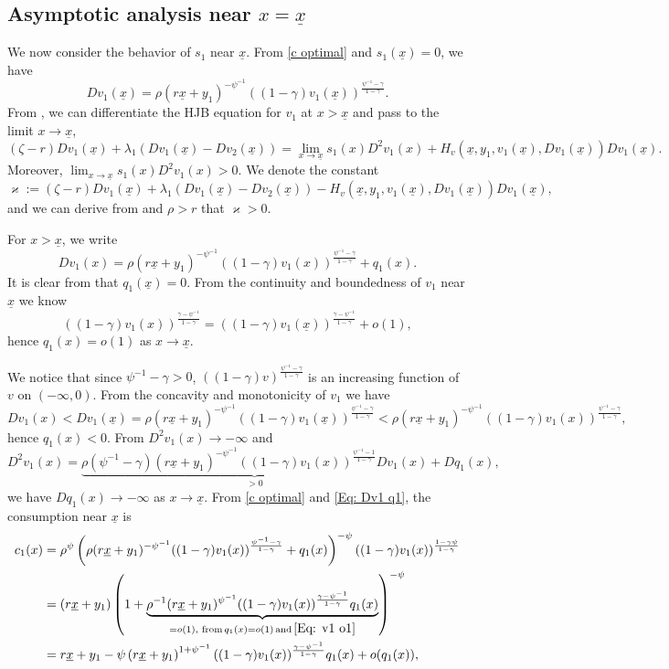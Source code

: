 \documentclass[11pt]{article}
\numberwithin{equation}{section}
\theoremstyle{definition}
\newcommand{\ux}{{\underline x}}
\newcommand{\beq}{\begin{equation}}
\newcommand{\eeq}{\end{equation}}
\newcommand{\ld}{\lambda}
\newcommand{\g}{\gamma}
\newcommand{\p}{\psi}
\newcommand{\z}{\zeta}
\newcommand{\lc}{\left(}
\newcommand{\rc}{\right)}
\theoremstyle{plain}
\begin{document}
\begin{appendices}
\section{Asymptotic analysis near $x=\ux$}\label{Expansion ux}
We now consider the behavior of $s_1$ near $\ux$. From \cref{c optimal} and $s_1(\ux)=0$, we have 
\beq\label{Eq: Dv1 ux}
Dv_1(\ux)=\rho (r\ux+y_1)^{-\p^{-1}}((1-\g)v_1(\ux))^{\frac{\p^{-1}-\g}{1-\g}}.
\eeq
From , we can differentiate the HJB equation for $v_1$ at $x>\ux$ and pass to the limit $x\to \ux$, 
$$
(\z-r)Dv_1(\ux)+\ld_1(Dv_1(\ux)-Dv_2(\ux))=\lim_{x\to \ux}s_1(x)D^2v_1(x)+H_v(\ux,y_1,v_1(\ux),Dv_1(\ux))Dv_1(\ux).
$$
Moreover, $\lim_{x\to \ux}s_1(x)D^2v_1(x)>0$. We denote the constant 
$$
\varkappa:=(\z-r)Dv_1(\ux)+\ld_1(Dv_1(\ux)-Dv_2(\ux))-H_v(\ux,y_1,v_1(\ux),Dv_1(\ux))Dv_1(\ux),
$$
and we can derive from  and $\rho> r$ that $\varkappa>0$.\par
For $x>\ux$, we write
\beq\label{Eq: Dv1 q1}
Dv_1(x)=\rho (r\ux+y_1)^{-\p^{-1}}((1-\g)v_1({x}))^{\frac{\p^{-1}-\g}{1-\g}}+q_1(x).
\eeq
It is clear from  that $q_1(\ux)=0$. From the continuity and boundedness of $v_1$ near $\ux$ we know 
\beq\label{Eq: v1 o1}
((1-\g)v_1(x))^{\frac{\g-\p^{-1}}{1-\g}}=((1-\g)v_1(\ux))^{\frac{\g-\p^{-1}}{1-\g}}+o(1),
\eeq
hence $q_1(x)=o(1)$ as $x\to \ux$.\par 
We notice that since $\p^{-1}-\g>0$, $((1-\g)v)^{\frac{\p^{-1}-\g}{1-\g}}$ is an increasing function of $v$ on $(-\infty,0)$. From the concavity and monotonicity of $v_1$ we have
$$
Dv_1(x)<Dv_1(\ux)=\rho (r\ux+y_1)^{-\p^{-1}}((1-\g)v_1(\ux))^{\frac{\p^{-1}-\g}{1-\g}}<\rho (r\ux+y_1)^{-\p^{-1}}((1-\g)v_1({x}))^{\frac{\p^{-1}-\g}{1-\g}},
$$
hence $q_1(x)<0$. From $D^2v_1(x)\to -\infty$ and 
\beq\label{Eq: D^2v1}
D^2v_1(x)=\underbrace{\rho (\p^{-1}-\g) (r\ux+y_1)^{-\p^{-1}}((1-\g)v_1({x}))^{\frac{\p^{-1}-1}{1-\g}}Dv_1({x})}_{>0}+Dq_1(x),
\eeq
we have $Dq_1(x)\to -\infty$ as $x\to \ux$. From \cref{c optimal} and \cref{Eq: Dv1 q1}, the consumption near $\ux$ is
$$
\begin{aligned}
c_1(x)={}&\rho^{\p}\lc\rho (r\ux+y_1)^{-\p^{-1}}((1-\g)v_1(x))^{\frac{\p^{-1}-\g}{1-\g}}+q_1(x)\rc^{-\p}((1-\g)v_1(x))^{\frac{1-\g \p}{1-\g}}\\
={}&(r\ux+y_1)\lc1+\underbrace{\rho^{-1} (r\ux+y_1)^{\p^{-1}}((1-\g)v_1(x))^{\frac{\g-\p^{-1}}{1-\g}}q_1(x)}_{=o(1),\,\,{\text{from}} \,q_1(x)=o(1)\, {\text{and}}\,\cref{Eq: v1 o1}}\rc^{-\p}\\
={}& r\ux+y_1-\p \lc r\ux+y_1\rc^{1+\p^{-1}}((1-\g)v_1(x))^{\frac{\g-\p^{-1}}{1-\g}}q_1(x)+o(q_1(x)),

\end{aligned}$$
\end{appendices}
\end{document}
